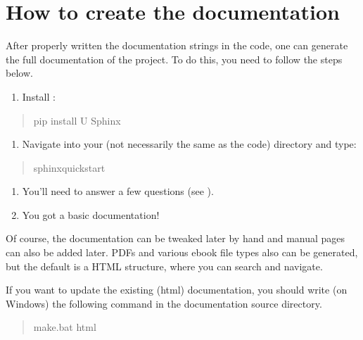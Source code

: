 \documentclass[letterpaper,10pt,english]{sphinxmanual}
\begin{document}
\section{How to create the documentation}
\label{\detokenize{styleguide:how-to-create-the-documentation}}
After properly written the documentation strings in the code, one can generate the full documentation of the project. To do this, you need to follow the steps below.
\begin{enumerate}
%
\item {} 
Install :

\end{enumerate}
\begin{quote}

pip install \sphinxhyphen{}U Sphinx
\end{quote}
\begin{enumerate}
%
\item {} 
Navigate into your  (not necessarily the same as the code) directory and type:

\end{enumerate}
\begin{quote}

sphinx\sphinxhyphen{}quickstart
\end{quote}
\begin{enumerate}
%
\item {} 
You’ll need to answer a few questions (see ).

\item {} 
You got a basic documentation!

\end{enumerate}

Of course, the documentation can be tweaked later by hand and manual pages can also be added later. PDFs and various ebook file types also can be generated, but the default is a HTML structure, where you can search and navigate.

If you want to update the existing (html) documentation, you should write (on Windows) the following command in the documentation source directory.
\begin{quote}

make.bat html
\end{quote}
\end{document}
